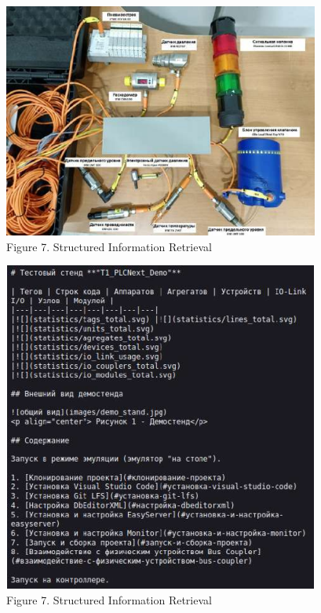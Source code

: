 \documentclass[11pt,final]{article}
\begin{document}
    \begin{multicols}{2}
        \begin{figure}[H]
            \centering
            \includegraphics[width=1.0135\linewidth]{3_mat.jpg}
            \label{fig:enter-label}
            {\scriptsize Figure 7. Structured Information Retrieval}
        \end{figure}

        \vspace{1em}

        \begin{figure}[H]
            \centering
            \includegraphics[width=1.0135\linewidth]{4_mat.jpg}
            \label{fig:enter-label}
            {\scriptsize Figure 7. Structured Information Retrieval}
        \end{figure}


\end{multicols}
\end{document}
